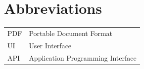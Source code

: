 \chapter*{Abbreviations}
\begin{tabular}{ll}
PDF & Portable Document Format \\
UI & User Interface \\
API & Application Programming Interface
\end{tabular}

